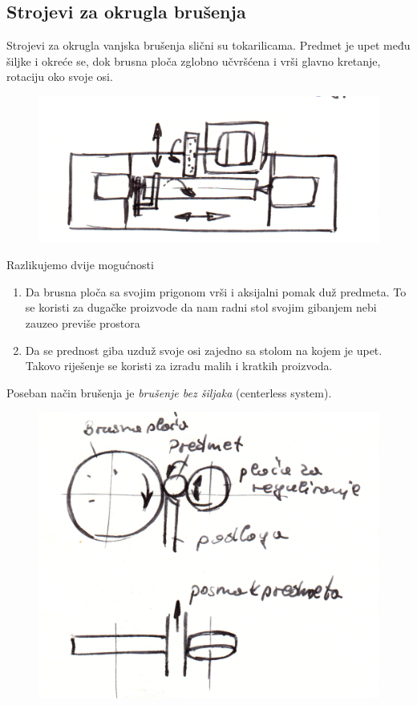 \documentclass[a4paper,12pt]{article}
\numberwithin{figure}{section}
\begin{document}
\subsection{Strojevi za okrugla brušenja}
Strojevi za okrugla vanjska brušenja slični su tokarilicama. Predmet je upet među šiljke i okreće se, dok brusna ploča zglobno učvršćena i vrši glavno kretanje, rotaciju oko svoje osi. \par
\begin{figure}[!h]
\begin{flushleft}
\includegraphics[scale=0.15]{image_30-1.png}
\end{flushleft}
\end{figure}
\FloatBarrier
Razlikujemo dvije mogućnosti
\begin{enumerate}
\item Da brusna ploča sa svojim prigonom vrši i aksijalni pomak duž predmeta. To se koristi za dugačke proizvode da nam radni stol svojim gibanjem nebi zauzeo previše prostora
\item Da se prednost giba uzduž svoje osi zajedno sa stolom na kojem je upet. Takovo riješenje se koristi za izradu malih i kratkih proizvoda.
\end{enumerate}
Poseban način brušenja je \textit{brušenje bez šiljaka} (centerless system). 
\begin{figure}[!h]
\centering
\includegraphics[scale=0.15]{image_30-2.png}
\end{figure}
\end{document}
